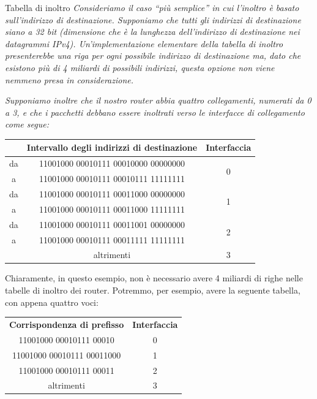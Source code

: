 \begin{Example}{Tabella di inoltro}{}
    \textit{Consideriamo il caso “più semplice” in cui l'inoltro è basato sull'indirizzo di destinazione. Supponiamo che tutti gli indirizzi di destinazione siano a 32 bit (dimensione che è la lunghezza dell'indirizzo di destinazione nei datagrammi IPv4). Un'implementazione elementare della tabella di inoltro presenterebbe una riga per ogni possibile indirizzo di destinazione ma, dato che esistono più di 4 miliardi di possibili indirizzi, questa opzione non viene nemmeno presa in considerazione.}
    
    \textit{Supponiamo inoltre che il nostro router abbia quattro collegamenti, numerati da 0 a 3, e che i pacchetti debbano essere inoltrati verso le interfacce di collegamento come segue:}
    
    \begin{center}
        \begin{tabular}{c c c}
            & \textbf{Intervallo degli indirizzi di destinazione} & \textbf{Interfaccia}\\\hline
            da & 11001000 00010111 00010000 00000000 & \multirow{2}{*}{0}\\
            a & 11001000 00010111 00010111 11111111 &\\\hline
            da & 11001000 00010111 00011000 00000000 & \multirow{2}{*}{1}\\
            a & 11001000 00010111 00011000 11111111 &\\\hline
            da & 11001000 00010111 00011001 00000000 & \multirow{2}{*}{2}\\
            a & 11001000 00010111 00011111 11111111 &\\\hline
            & altrimenti & 3
        \end{tabular}
    \end{center}

    Chiaramente, in questo esempio, non è necessario avere 4 miliardi di righe nelle tabelle di inoltro dei router. Potremmo, per esempio, avere la seguente tabella, con appena quattro voci:

    \begin{center}
        \begin{tabular}{c c}
            \textbf{Corrispondenza di prefisso} & \textbf{Interfaccia}\\
            11001000 00010111 00010 & 0\\
            11001000 00010111 00011000 & 1\\
            11001000 00010111 00011 & 2\\
            altrimenti & 3
        \end{tabular}
    \end{center}


\end{Example}
